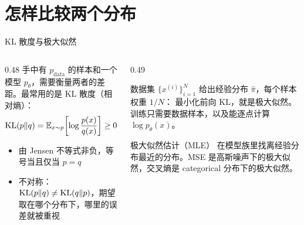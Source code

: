 \documentclass[aspectratio=169,10pt,UTF8,fontset=none]{ctexbeamer}
\begin{document}
\section{怎样比较两个分布}

\begin{frame}{KL 散度与极大似然}
  \begin{columns}[T]
    \begin{column}{0.48\textwidth}
      手中有 $p_{\mathrm{data}}$ 的样本和一个模型 $p_\theta$，需要衡量两者的差距。最常用的是 KL 散度（相对熵）：
      \[
        \mathrm{KL}(p\Vert q)=\mathbb{E}_{x\sim p}\!\left[\log\frac{p(x)}{q(x)}\right]\geq0
      \]
      \begin{itemize}
        \item 由 Jensen 不等式非负，等号当且仅当 $p=q$
        \item 不对称：$\mathrm{KL}(p\Vert q)\neq\mathrm{KL}(q\Vert p)$，期望取在哪个分布下，哪里的误差就被重视
      \end{itemize}
      \vspace{2mm}
      {\footnotesize{}}
    \end{column}
    \begin{column}{0.49\textwidth}
      \begin{keystep}
        数据集 $\{x^{(i)}\}_{i=1}^N$ 给出经验分布 $\hat\pi$，每个样本权重 $1/N$：
        最小化前向 KL，就是极大似然。训练只需要数据样本，以及能逐点计算 $\log p_\theta(x)$。
      \end{keystep}
      \begin{concept}{极大似然估计（MLE）}
        在模型族里找离经验分布最近的分布。MSE 是高斯噪声下的极大似然，交叉熵是 categorical 分布下的极大似然。
      \end{concept}
    \end{column}
  \end{columns}
\end{frame}
\end{document}
